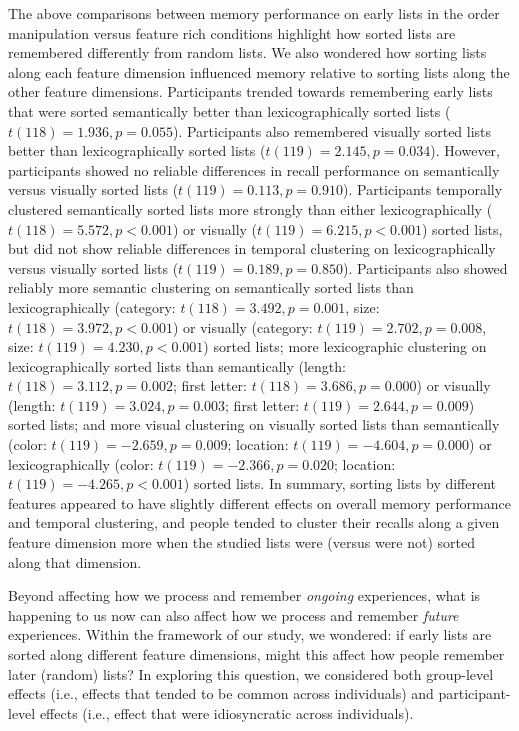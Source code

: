 \documentclass[11pt]{article}
\begin{document}
The above comparisons between memory performance on early lists in the order
manipulation versus feature rich conditions highlight how sorted lists are
remembered differently from random lists. We also wondered how sorting lists
along each feature dimension influenced memory relative to sorting lists along
the other feature dimensions. Participants trended towards remembering early
lists that were sorted semantically better than lexicographically sorted lists
($t(118) = 1.936, p = 0.055$). Participants also remembered visually sorted
lists better than lexicographically sorted lists ($t(119) = 2.145, p = 0.034$).
However, participants showed no reliable differences in recall performance on
semantically versus visually sorted lists ($t(119) = 0.113, p = 0.910$).
Participants temporally clustered semantically sorted lists more strongly than
either lexicographically ($t(118) = 5.572, p < 0.001$) or visually ($t(119) =
6.215, p < 0.001$) sorted lists, but did not show reliable differences in
temporal clustering on lexicographically versus visually sorted lists ($t(119)
= 0.189, p = 0.850$). Participants also showed reliably more semantic
clustering on semantically sorted lists than lexicographically (category:
$t(118) = 3.492, p = 0.001$, size: $t(118) = 3.972, p < 0.001$) or visually
(category: $t(119) = 2.702, p = 0.008$, size: $t(119) = 4.230, p < 0.001$)
sorted lists; more lexicographic clustering on lexicographically sorted lists
than semantically (length: $t(118) = 3.112, p = 0.002$; first letter: $t(118) =
3.686, p = 0.000$) or visually (length: $t(119) = 3.024, p = 0.003$; first
letter: $t(119) = 2.644, p = 0.009$) sorted lists; and more visual clustering
on visually sorted lists than semantically (color: $t(119) = -2.659, p =
0.009$; location: $t(119) = -4.604, p = 0.000$) or lexicographically (color:
$t(119) = -2.366, p = 0.020$; location: $t(119) = -4.265, p < 0.001$) sorted
lists. In summary, sorting lists by different features appeared to have
slightly different effects on overall memory performance and temporal
clustering, and people tended to cluster their recalls along a given feature
dimension more when the studied lists were (versus were not) sorted along that
dimension.

Beyond affecting how we process and remember \textit{ongoing} experiences, what
is happening to us now can also affect how we process and remember
\textit{future} experiences. Within the framework of our study, we wondered: if
early lists are sorted along different feature dimensions, might this affect
how people remember later (random) lists? In exploring this question, we
considered both group-level effects (i.e., effects that tended to be common
across individuals) and participant-level effects (i.e., effect that were
idiosyncratic across individuals).
\end{document}
